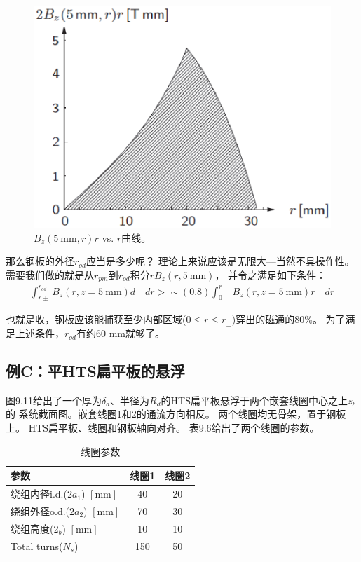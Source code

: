 \begin{figure}
	\centering
	\includegraphics[scale=0.6]{chpt9/figs/fig9.10.eps}
	\caption{$B_z(5\ \mathrm{mm},r)r$ vs. $r$曲线。}
\end{figure}

那么钢板的外径$r_{od}$应当是多少呢？
理论上来说应该是无限大---当然不具操作性。
需要我们做的就是从$r_{pm}$到$r_{od}$积分$rB_z(r,5\ \mathrm{mm})$，
并令之满足如下条件：
\begin{align*}%
\int_{r\pm}^{r_{od}}B_{z}(r,z=5\ \mathrm{ mm})d\quad dr>\sim(0.8)\int_{0}^{r\pm}B_{z}(r,z=5\ \mathrm{ mm})r\quad dr
\end{align*}

也就是收，钢板应该能捕获至少内部区域($0\le r\le r_{\pm}$)穿出的磁通的80\%。
为了满足上述条件，$r_{od}$有约60 mm就够了。


\subsection{例C：平HTS扁平板的悬浮}
图9.11给出了一个厚为$\delta_d$、半径为$R_d$的HTS扁平板悬浮于两个嵌套线圈中心之上$z_\ell$的
系统截面图。嵌套线圈1和2的通流方向相反。
两个线圈均无骨架，置于钢板上。
HTS扁平板、线圈和钢板轴向对齐。
表9.6给出了两个线圈的参数。


\begin{table}[htbp]\small
\centering
\caption{线圈参数}  
\begin{tabular}{|l|c|c|}
\hline
参数 & 线圈1 & 线圈2 \\ \hline
绕组内径i.d.($2a_1$) $\left[\mathrm{mm}\right]$ & 40 & 20 \\ \hline
绕组外径o.d.($2a_2$) $\left[\mathrm{mm}\right]$ & 70 & 30 \\ \hline
绕组高度($2_b$) $\left[\mathrm{mm}\right]$ & 10 & 10 \\ \hline
Total turns($N_s$) & 150 & 50 \\ \hline
\end{tabular}
\end{table}

